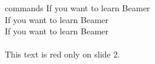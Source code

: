 
\begin{frame}{commands}
    If you want to learn Beamer \\
    If you want to learn Beamer \\
    If you want to learn Beamer \\
     \\
      This text is red only on slide 2. \\
\end{frame}